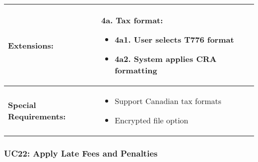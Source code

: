 \documentclass[12pt]{article}
\begin{document}
\begin{longtable}{|p{3cm}|p{11cm}|}
\hline
\textbf{Extensions:} & 
\textbf{4a. Tax format:}
\begin{itemize}
    \item 4a1. User selects T776 format
    \item 4a2. System applies CRA formatting
\end{itemize} \\
\hline
\textbf{Special Requirements:} & 
\begin{itemize}
    \item Support Canadian tax formats
    \item Encrypted file option
\end{itemize} \\
\hline
\end{longtable}

\subsubsection{UC22: Apply Late Fees and Penalties}
\end{document}
